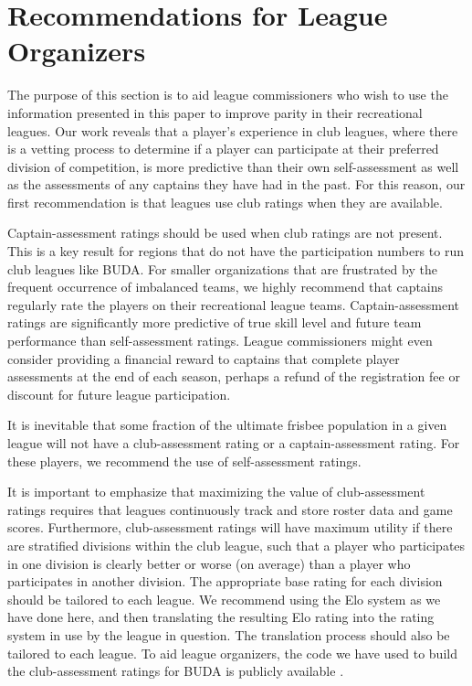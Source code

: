 \section{Recommendations for League Organizers}\label{sec:recommendations}

The purpose of this section is to aid league commissioners who wish to use the information presented in this paper to improve parity in their recreational leagues. Our work reveals that a player's experience in club leagues, where there is a vetting process to determine if a player can participate at their preferred division of competition, is more predictive than their own self-assessment as well as the assessments of any captains they have had in the past. For this reason, our first recommendation is that leagues use club ratings when they are available. 

Captain-assessment ratings should be used when club ratings are not present. This is a key result for regions that do not have the participation numbers to run club leagues like BUDA. For smaller organizations that are frustrated by the frequent occurrence of imbalanced teams, we highly recommend that captains regularly rate the players on their recreational league teams. Captain-assessment ratings are significantly more predictive of true skill level and future team performance than self-assessment ratings. League commissioners might even consider providing a financial reward to captains that complete player assessments at the end of each season, perhaps a refund of the registration fee or discount for future league participation. 

It is inevitable that some fraction of the ultimate frisbee population in a given league will not have a club-assessment rating or a captain-assessment rating. For these players, we recommend the use of self-assessment ratings.

It is important to emphasize that maximizing the value of club-assessment ratings requires that leagues continuously track and store roster data and game scores. Furthermore, club-assessment ratings will have maximum utility if there are stratified divisions within the club league, such that a player who participates in one division is clearly better or worse (on average) than a player who participates in another division. The appropriate base rating for each division should be tailored to each league. We recommend using the Elo system as we have done here, and then translating the resulting Elo rating into the rating system in use by the league in question. The translation process should also be tailored to each league. To aid league organizers, the code we have used to build the club-assessment ratings for BUDA is publicly available \cite{shanegit}.